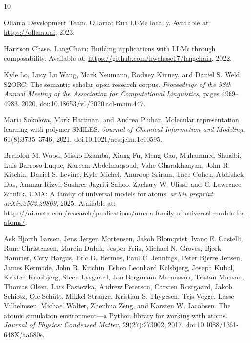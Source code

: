\documentclass[%
 reprint,
 amsmath,amssymb,
 aps,
]{revtex4-2}
\begin{document}
\begin{thebibliography}{10}

Ollama Development Team.
\newblock Ollama: Run LLMs locally.
\newblock Available at: \url{https://ollama.ai}, 2023.

Harrison Chase.
\newblock LangChain: Building applications with LLMs through composability.
\newblock Available at: \url{https://github.com/hwchase17/langchain}, 2022.

Kyle Lo, Lucy Lu Wang, Mark Neumann, Rodney Kinney, and Daniel S. Weld.
\newblock S2ORC: The semantic scholar open research corpus.
\newblock \emph{Proceedings of the 58th Annual Meeting of the Association for Computational Linguistics}, pages 4969--4983, 2020.
\newblock doi:10.18653/v1/2020.acl-main.447.

Maria Sokolova, Mark Hartman, and Andrea Pluhar.
\newblock Molecular representation learning with polymer SMILES.
\newblock \emph{Journal of Chemical Information and Modeling}, 61(8):3735--3746, 2021.
\newblock doi:10.1021/acs.jcim.1c00595.

Brandon M. Wood, Misko Dzamba, Xiang Fu, Meng Gao, Muhammed Shuaibi, Luis Barroso-Luque, Kareem Abdelmaqsoud, Vahe Gharakhanyan, John R. Kitchin, Daniel S. Levine, Kyle Michel, Anuroop Sriram, Taco Cohen, Abhishek Das, Ammar Rizvi, Sushree Jagriti Sahoo, Zachary W. Ulissi, and C. Lawrence Zitnick.
\newblock UMA: A family of universal models for atoms.
\newblock \emph{arXiv preprint arXiv:2502.20809}, 2025.
\newblock Available at: \url{https://ai.meta.com/research/publications/uma-a-family-of-universal-models-for-atoms/}.

Ask Hjorth Larsen, Jens J{\o}rgen Mortensen, Jakob Blomqvist, Ivano E. Castelli, Rune Christensen, Marcin Dułak, Jesper Friis, Michael N. Groves, Bj{\o}rk Hammer, Cory Hargus, Eric D. Hermes, Paul C. Jennings, Peter Bjerre Jensen, James Kermode, John R. Kitchin, Esben Leonhard Kolsbjerg, Joseph Kubal, Kristen Kaasbjerg, Steen Lysgaard, J{\'o}n Bergmann Maronsson, Tristan Maxson, Thomas Olsen, Lars Pastewka, Andrew Peterson, Carsten Rostgaard, Jakob Schi{\o}tz, Ole Sch{\"u}tt, Mikkel Strange, Kristian S. Thygesen, Tejs Vegge, Lasse Vilhelmsen, Michael Walter, Zhenhua Zeng, and Karsten W. Jacobsen.
\newblock The atomic simulation environment---a Python library for working with atoms.
\newblock \emph{Journal of Physics: Condensed Matter}, 29(27):273002, 2017.
\newblock doi:10.1088/1361-648X/aa680e.

\end{thebibliography}
\end{document}
